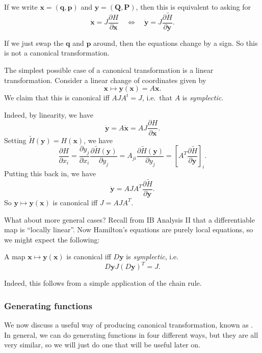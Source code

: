 \documentclass[a4paper]{article}
\begin{document}
If we write $\mathbf{x} = (\mathbf{q}, \mathbf{p})$ and $\mathbf{y} = (\mathbf{Q}, \mathbf{P})$, then this is equivalent to asking for
\[
  \dot{\mathbf{x}} = J \frac{\partial H}{\partial \mathbf{x}} \quad\Longleftrightarrow\quad \dot{\mathbf{y}} = J \frac{\partial \tilde{H}}{ \partial \mathbf{y}}.
\]
\begin{eg}
  If we just swap the $\mathbf{q}$ and $\mathbf{p}$ around, then the equations change by a sign. So this is not a canonical transformation.
\end{eg}

\begin{eg}
  The simplest possible case of a canonical transformation is a linear transformation. Consider a linear change of coordinates given by
  \[
    \mathbf{x} \mapsto \mathbf{y}(\mathbf{x}) = A\mathbf{x}.
  \]
  We claim that this is canonical iff $AJA^t = J$, i.e.\ that $A$ is \emph{symplectic}.

  Indeed, by linearity, we have
  \[
    \dot{\mathbf{y}} = A\dot{\mathbf{x}} = AJ\frac{\partial H}{\partial \mathbf{x}}.
  \]
  Setting $\tilde{H}(\mathbf{y}) = H(\mathbf{x})$, we have
  \[
    \frac{\partial H}{\partial x_i} = \frac{\partial y_j}{\partial x_i} \frac{\partial \tilde{H}(\mathbf{y})}{\partial y_j} = A_{ji} \frac{\partial \tilde{H}(\mathbf{y})}{\partial y_j} = \left[A^T \frac{\partial \tilde{H}}{\partial \mathbf{y}}\right]_i.
  \]
  Putting this back in, we have
  \[
    \dot{\mathbf{y}} = AJA^T \frac{\partial\tilde{H}}{\partial \mathbf{y}}.
  \]
  So $\mathbf{y} \mapsto \mathbf{y}(\mathbf{x})$ is canonical iff $J = AJA^T$.
\end{eg}

What about more general cases? Recall from IB Analysis II that a differentiable map is ``locally linear''. Now Hamilton's equations are purely local equations, so we might expect the following:
\begin{prop}
  A map $\mathbf{x} \mapsto \mathbf{y}(\mathbf{x})$ is canonical iff $D\mathbf{y}$ is \emph{symplectic}, i.e.
  \[
    D\mathbf{y} J (D\mathbf{y})^T = J.
  \]
\end{prop}
Indeed, this follows from a simple application of the chain rule.

\subsubsection*{Generating functions}
We now discuss a useful way of producing canonical transformation, known as . In general, we can do generating functions in four different ways, but they are all very similar, so we will just do one that will be useful later on.
\end{document}
